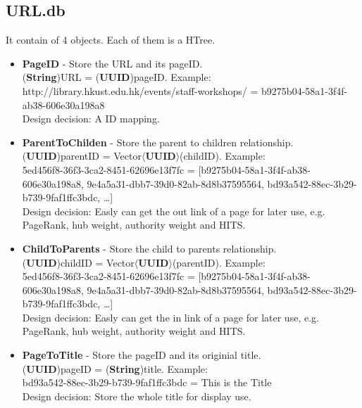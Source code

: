 \documentclass{article}
\begin{document}
    \subsection*{URL.db}
    It contain of 4 objects. Each of them is a HTree.
    \begin{itemize}
        \item \textbf{PageID} - Store the URL and its pageID. \\[0.4em]
        (\textbf{String})URL = (\textbf{UUID})pageID. Example:\\[0.4em]
        http://library.hkust.edu.hk/events/staff-workshops/ = b9275b04-58a1-3f4f-ab38-606e30a198a8 \\[0.4em]
        Design decision: A ID mapping. 

        \item \textbf{ParentToChilden} - Store the parent to children relationship. \\[0.4em]
        (\textbf{UUID})parentID = Vector$\langle$\textbf{UUID}$\rangle$(childID). Example:\\[0.4em]
        5ed456f8-36f3-3ca2-8451-62696e13f7fc = [b9275b04-58a1-3f4f-ab38-606e30a198a8, 9e4a5a31-dbb7-39d0-82ab-8d8b37595564, bd93a542-88ec-3b29-b739-9faf1ffc3bdc, \dots] \\[0.4em]
        Design decision: Easly can get the out link of a page for later use, e.g. PageRank, hub weight, authority weight and HITS.
        
        \item \textbf{ChildToParents} - Store the child to parents relationship. \\[0.4em]
        (\textbf{UUID})childID = Vector$\langle$\textbf{UUID}$\rangle$(parentID). Example:\\[0.4em]
        5ed456f8-36f3-3ca2-8451-62696e13f7fc = [b9275b04-58a1-3f4f-ab38-606e30a198a8, 9e4a5a31-dbb7-39d0-82ab-8d8b37595564, bd93a542-88ec-3b29-b739-9faf1ffc3bdc, \dots] \\[0.4em]
        Design decision: Easly can get the in link of a page for later use, e.g. PageRank, hub weight, authority weight and HITS.

        \item \textbf{PageToTitle} - Store the pageID and its originial title. \\[0.4em]
        (\textbf{UUID})pageID = (\textbf{String})title. Example:\\[0.4em]
        bd93a542-88ec-3b29-b739-9faf1ffc3bdc = This is the Title\\[0.4em]
        Design decision: Store the whole title for display use.


\end{itemize}
\end{document}
